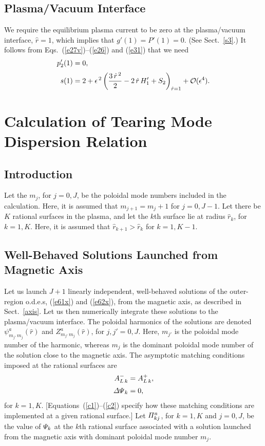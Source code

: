 \documentclass[12pt,prb,aps]{revtex4-1}
\begin{document}
\subsection{Plasma/Vacuum Interface}
We require the equilibrium plasma current to be zero at the plasma/vacuum interface, $\hat{r}=1$, which
implies that $g'(1)=P'(1)= 0$. (See Sect.~\ref{s3}.) It follows from Eqs.~(\ref{e27v})--(\ref{e26}) and (\ref{e31}) that we need\,\cite{am1}
\begin{align}
p_2'(1) &= 0,\label{e222}\\[0.5ex]
s(1) &= 2+ \epsilon^{\,2}\left(\frac{3\,\hat{r}^{\,2}}{2}-2\,\hat{r}\,H_1'+S_2\right)_{\hat{r}=1}
+{\cal O}(\epsilon^4).\label{e223}
\end{align}

\section{Calculation of  Tearing Mode Dispersion Relation}\label{etm}
\subsection{Introduction}
Let the $m_j$, for $j=0,J$, be the poloidal mode numbers included in the calculation. Here, it is assumed that $m_{j+1}=m_j+1$ for $j=0,J-1$. 
Let there be $K$ rational surfaces in the plasma, and let the $k$th surface lie at radius $\hat{r}_k$, for $k=1,K$. Here,
it is assumed that $\hat{r}_{k+1}>\hat{r}_k$ for $k=1,K-1$. 

\subsection{Well-Behaved Solutions Launched from Magnetic Axis}\label{axisl}
Let us launch $J+1$ linearly independent, well-behaved solutions of the outer-region o.d.e.s, (\ref{e61x}) and (\ref{e62x}), from the
magnetic axis, as described in Sect.~\ref{axis}. Let us then numerically integrate these solutions to the plasma/vacuum interface. The poloidal harmonics of
the solutions are denoted $\psi^a_{m_{j'}\,m_j}(\hat{r})$ and $Z^a_{m_{j'}\,m_j}(\hat{r})$, for $j,j'=0,J$. Here,
$m_{j'}$ is the poloidal mode number of the harmonic, whereas $m_j$ is the dominant poloidal mode number of the solution close to the
magnetic axis. The asymptotic matching conditions imposed at the rational surfaces are
\begin{align}
A_{L\,k}^{-} &= A_{L\,k}^+,\\[0.5ex]
{\mit\Delta\Psi}_k &= 0,
\end{align}
for $k=1,K$. [Equations~(\ref{c1})--(\ref{c2}) specify how these matching conditions are implemented at a given rational surface.]
Let ${\mit\Pi}_{kj}^a$, for   $k=1,K$ and $j=0,J$,  be the value of ${\mit\Psi}_k$ at the $k$th rational surface associated with a solution launched
from the magnetic axis with dominant poloidal mode number $m_j$. 
\end{document}
